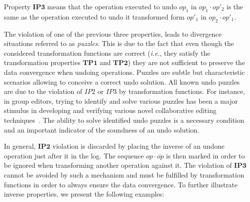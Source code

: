 \documentclass[submission,copyright,creativecommons]{eptcs}
\begin{document}
Property $\mathbf{IP3}$ means that the operation executed to undo $op_1$ in $op_1\cdot op'_2$ is the same as the operation executed
to undo it transformed form $op'_1$ in $op_2\cdot op'_1$.

The violation of one of the previous three properties, leads to divergence situations referred to as \emph{puzzles}. This is due to the fact that even though the considered transformation functions are correct (\textit{i.e.},
they satisfy the transformation properties $\mathbf{TP1}$ and $\mathbf{TP2}$) they are not sufficient to preserve the data
convergence when undoing operations.
Puzzles are subtle but characteristic scenarios allowing to conceive a correct undo solution.
All known undo puzzles are  due to the
violation of $IP2$ or $IP3$  by transformation functions.
For instance, in group editors, trying to identify and solve various puzzles has been a major stimulus in developing and verifying various novel collaborative editing techniques~\cite{Sun98, Ressel99, Sun00}. The ability to solve identified undo puzzles is a necessary condition and an important indicator of the
soundness of an undo solution.  

In general, $\mathbf{IP2}$ violation is discarded by placing the inverse of an undone operation  just after it in the log. The sequence $op \cdot \overline{op}$ is then marked in order to be ignored when transforming another operation against it. The violation of $\mathbf{IP3}$ cannot be avoided by such a mechanism and must be fulfilled by transformation functions in order to always ensure the data convergence.
To further illustrate inverse properties, we present the following examples:
 
\end{document}
